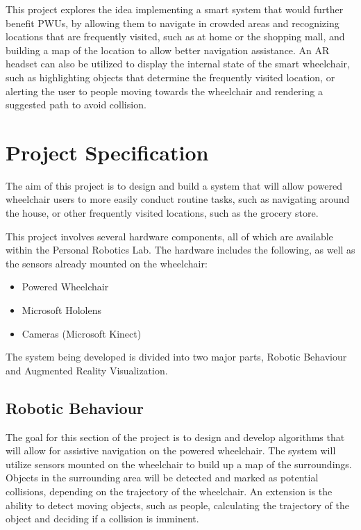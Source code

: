 \documentclass[12pt,a4paper]{report}
\begin{document}
This project explores the idea implementing a smart system that would further benefit PWUs, by allowing them to navigate in crowded areas and recognizing locations that are frequently visited, such as at home or the shopping mall, and building a map of the location to allow better navigation assistance. An AR headset can also be utilized to display the internal state of the smart wheelchair, such as highlighting objects that determine the frequently visited location, or alerting the user to people moving towards the wheelchair and rendering a suggested path to avoid collision.

\section{Project Specification}
The aim of this project is to design and build a system that will allow powered wheelchair users to more easily conduct routine tasks, such as navigating around the house, or other frequently visited locations, such as the grocery store.

This project involves several hardware components, all of which are available within the Personal Robotics Lab. The hardware includes the following, as well as the sensors already mounted on the wheelchair:

\begin{itemize}
	\item Powered Wheelchair
	\item Microsoft Hololens
	\item Cameras (Microsoft Kinect)
\end{itemize}


The system being developed is divided into two major parts, Robotic Behaviour and Augmented Reality Visualization.

\subsection{Robotic Behaviour}
The goal for this section of the project is to design and develop algorithms that will allow for assistive navigation on the powered wheelchair. The system will utilize sensors mounted on the wheelchair to build up a map of the surroundings. Objects in the surrounding area will be detected and marked as potential collisions, depending on the trajectory of the wheelchair. An extension is the ability to detect moving objects, such as people, calculating the trajectory of the object and deciding if a collision is imminent.
\end{document}
